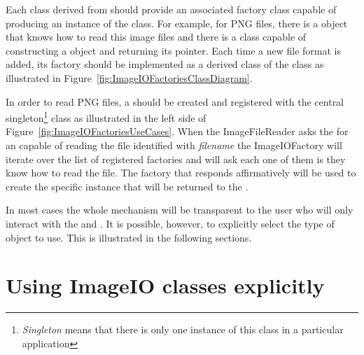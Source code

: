 Each class derived from  should provide an associated factory
class capable of producing an instance of the  class. For
example, for PNG files, there is a  object that knows how
to read this image files and there is a  class
capable of constructing a  object and returning its pointer.
Each time a new file format is added, its factory should be implemented as a
derived class of the  class as illustrated in
Figure~\ref{fig:ImageIOFactoriesClassDiagram}. 

In order to read PNG files, a  should be created and
registered with the central 
singleton\footnote{\emph{Singleton} means that there is only one instance of
this class in a particular application} class as illustrated in the left side
of Figure~\ref{fig:ImageIOFactoriesUseCases}. When the ImageFileReader asks the
 for an  capable of reading the file
identified with \emph{filename} the ImageIOFactory will iterate over the list
of registered factories and will ask each one of them is they know how to read
the file. The factory that responds affirmatively will be used to create the
specific  instance that will be returned to the
.

In most cases the whole mechanism will be transparent to the user who will only
interact with the  and . It is
possible, however, to explicitly select the type of  object to use.
This is illustrated in the following sections.


\section{Using ImageIO classes explicitly}
\label{sec:ImageReadExportVTK}




